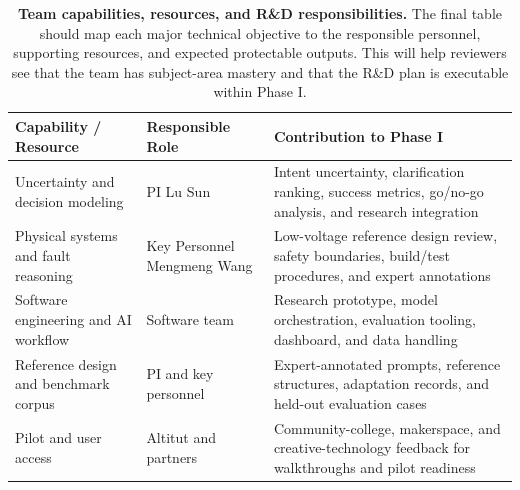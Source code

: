 \begin{table}[H]
\centering
\caption{\textbf{Team capabilities, resources, and R\&D responsibilities.} The final table should map each major technical objective to the responsible personnel, supporting resources, and expected protectable outputs. This will help reviewers see that the team has subject-area mastery and that the R\&D plan is executable within Phase I.}
\label{tab:team_capabilities}
\renewcommand{\arraystretch}{1.15}
\small
\begin{tabular}{p{} p{} p{}}
\hline
\textbf{Capability / Resource} & \textbf{Responsible Role} & \textbf{Contribution to Phase I} \\
\hline
Uncertainty and decision modeling & PI Lu Sun & Intent uncertainty, clarification ranking, success metrics, go/no-go analysis, and research integration \\
\hline
Physical systems and fault reasoning & Key Personnel Mengmeng Wang & Low-voltage reference design review, safety boundaries, build/test procedures, and expert annotations \\
\hline
Software engineering and AI workflow & Software team & Research prototype, model orchestration, evaluation tooling, dashboard, and data handling \\
\hline
Reference design and benchmark corpus & PI and key personnel & Expert-annotated prompts, reference structures, adaptation records, and held-out evaluation cases \\
\hline
Pilot and user access & Altitut and partners & Community-college, makerspace, and creative-technology feedback for walkthroughs and pilot readiness \\
\hline
\end{tabular}
\end{table}



